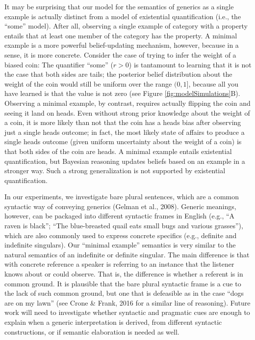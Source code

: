 \documentclass[floatsintext,doc]{apa6}
\newcommand{\mht}[1]{{\textcolor{Blue}{[mht: #1]}}}
\begin{document}
It may be surprising that our model for the semantics of generics as a single example is actually distinct from a model of existential quantification (i.e., the ``some'' model). 
After all, observing a single example of category with a property entails that at least one member of the category has the property. 
A minimal example is a more powerful belief-updating mechanism, however, because in a sense, it is more concrete. 
Consider the case of trying to infer the weight of a biased coin: The quantifier ``some'' ($r > 0$) is tantamount to learning that it is not the case that both sides are tails; the posterior belief distribution about the weight of the coin would still be uniform over the range $(0, 1]$, because all you have learned is that the value is not zero (see Figure \ref{fig:modelSimulations}B).
Observing a minimal example, by contrast, requires actually flipping the coin and seeing it land on heads. 
Even without strong prior knowledge about the weight of a coin, it is more likely than not that the coin has a heads bias after observing just a single heads outcome; in fact, the most likely state of affairs to produce a single heads outcome (given uniform uncertainty about the weight of a coin) is that both sides of the coin are heads.
A minimal example entails existential quantification, but Bayesian reasoning updates beliefs based on an example in a stronger way.
Such a strong generalization is not supported by existential quantification.

In our experiments, we investigate bare plural sentences, which are a common syntactic way of conveying generics (Gelman et al., 2008).
Generic meanings, however, can be packaged into different syntactic frames in English (e.g., ``A raven is black''; ``The blue-breasted quail eats small bugs and various grasses''), which are also commonly used to express concrete specifics (e.g., definite and indefinite singulars). 
Our ``minimal example'' semantics is very similar to the natural semantics of an indefinite or definite singular.
The main difference is that with concrete reference a speaker is referring to an instance that the listener knows about or could observe. 
That is, the difference is whether a referent is in common ground.
It is plausible that the bare plural syntactic frame is a cue to the lack of such common ground, but one that is defeasible as in the case ``dogs are on my lawn'' (see Crone \& Frank, 2016 for a similar line of reasoning).
Future work will need to investigate whether syntactic and pragmatic cues are enough to explain when a generic interpretation is derived, from different syntactic constructions, or if semantic elaboration is needed as well.
\end{document}
